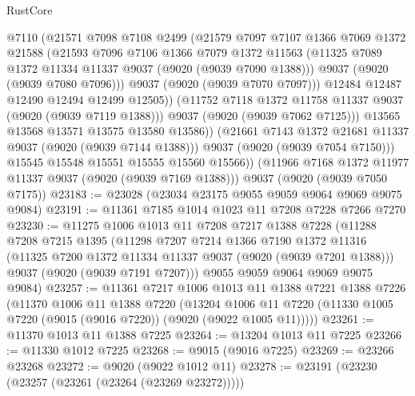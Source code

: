 \begin{lexlean}{RustCore}
\begin{coremodule}
                  @7110
                  (@21571
                    @7098
                    @7108
                    @2499
                    (@21579
                      @7097
                      @7107
                      @1366
                      @7069
                      @1372
                      @21588
                      (@21593
                        @7096
                        @7106
                        @1366
                        @7079
                        @1372
                        @11563
                        (@11325 @7089 @1372 @11334 @11337 @9037 (@9020 (@9039 @7090 @1388)))
                        @9037
                        (@9020 (@9039 @7080 @7096)))
                      @9037
                      (@9020 (@9039 @7070 @7097)))
                    @12484
                    @12487
                    @12490
                    @12494
                    @12499
                    @12505))
                (@11752 @7118 @1372 @11758 @11337 @9037 (@9020 (@9039 @7119 @1388)))
                @9037
                (@9020 (@9039 @7062 @7125)))
              @13565
              @13568
              @13571
              @13575
              @13580
              @13586))
          (@21661 @7143 @1372 @21681 @11337 @9037 (@9020 (@9039 @7144 @1388)))
          @9037
          (@9020 (@9039 @7054 @7150)))
        @15545
        @15548
        @15551
        @15555
        @15560
        @15566))
    (@11966 @7168 @1372 @11977 @11337 @9037 (@9020 (@9039 @7169 @1388)))
    @9037
    (@9020 (@9039 @7050 @7175))
@23183 := @23028 (@23034 @23175 @9055 @9059 @9064 @9069 @9075 @9084)
@23191 := @11361 @7185 @1014 @1023 @11 @7208 @7228 @7266 @7270
@23230 := @11275
    @1006
    @1013
    @11
    @7208
    @7217
    @1388
    @7228
    (@11288
      @7208
      @7215
      @1395
      (@11298
        @7207
        @7214
        @1366
        @7190
        @1372
        @11316
        (@11325 @7200 @1372 @11334 @11337 @9037 (@9020 (@9039 @7201 @1388)))
        @9037
        (@9020 (@9039 @7191 @7207)))
      @9055
      @9059
      @9064
      @9069
      @9075
      @9084)
@23257 := @11361
    @7217
    @1006
    @1013
    @11
    @1388
    @7221
    @1388
    @7226
    (@11370
      @1006
      @11
      @1388
      @7220
      (@13204 @1006 @11 @7220 (@11330 @1005 @7220 (@9015 (@9016 @7220)) (@9020 (@9022 @1005 @11)))))
@23261 := @11370 @1013 @11 @1388 @7225
@23264 := @13204 @1013 @11 @7225
@23266 := @11330 @1012 @7225
@23268 := @9015 (@9016 @7225)
@23269 := @23266 @23268
@23272 := @9020 (@9022 @1012 @11)
@23278 := @23191 (@23230 (@23257 (@23261 (@23264 (@23269 @23272)))))

\end{coremodule}
\end{lexlean}
